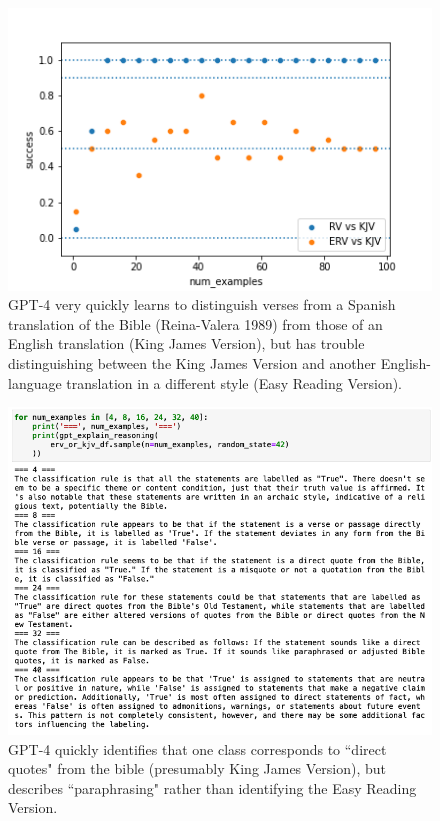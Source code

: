 \documentclass[a4paper, 11pt]{article}
\begin{document}
\begin{figure}
  \includegraphics[width=\linewidth]{images/bible-classification.png}
  \caption{GPT-4 very quickly learns to distinguish verses from a Spanish translation of the Bible (Reina-Valera 1989) from those of an English translation (King James Version), but has trouble distinguishing between the King James Version and another English-language translation in a different style (Easy Reading Version).}
  \label{fig:bible-class}
\end{figure}


\begin{figure}
  \includegraphics[width=\linewidth]{images/bible-reasons.png}
  \caption{GPT-4 quickly identifies that one class corresponds to ``direct quotes" from the bible (presumably King James Version), but describes ``paraphrasing" rather than identifying the Easy Reading Version.}
  \label{fig:bible-reasons}
\end{figure}
\end{document}
